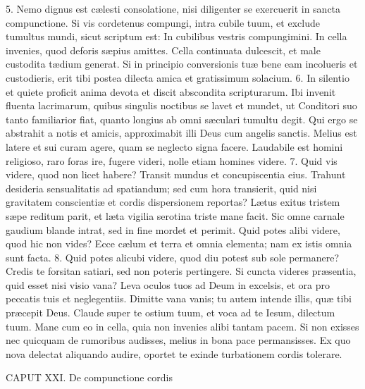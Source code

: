 5. Nemo dignus est cælesti consolatione, nisi diligenter se exercuerit in sancta compunctione. Si vis cordetenus compungi, intra cubile tuum, et exclude tumultus mundi, sicut scriptum est: In cubilibus vestris compungimini. In cella invenies, quod deforis sæpius amittes. Cella continuata dulcescit, et male custodita tædium generat. Si in principio conversionis tuæ bene eam incolueris et custodieris, erit tibi postea dilecta amica et gratissimum solacium.
6. In silentio et quiete proficit anima devota et discit abscondita scripturarum. Ibi invenit fluenta lacrimarum, quibus singulis noctibus se lavet et mundet, ut Conditori suo tanto familiarior fiat, quanto longius ab omni sæculari tumultu degit. Qui ergo se abstrahit a notis et amicis, approximabit illi Deus cum angelis sanctis. Melius est latere et sui curam agere, quam se neglecto signa facere. Laudabile est homini religioso, raro foras ire, fugere videri, nolle etiam homines videre.
7. Quid vis videre, quod non licet habere? Transit mundus et concupiscentia eius. Trahunt desideria sensualitatis ad spatiandum; sed cum hora transierit, quid nisi gravitatem conscientiæ et cordis dispersionem reportas? Lætus exitus tristem sæpe reditum parit, et læta vigilia serotina triste mane facit. Sic omne carnale gaudium blande intrat, sed in fine mordet et perimit. Quid potes alibi videre, quod hic non vides? Ecce cælum et terra et omnia elementa; nam ex istis omnia sunt facta.
8. Quid potes alicubi videre, quod diu potest sub sole permanere? Credis te forsitan satiari, sed non poteris pertingere. Si cuncta videres præsentia, quid esset nisi visio vana? Leva oculos tuos ad Deum in excelsis, et ora pro peccatis tuis et neglegentiis. Dimitte vana vanis; tu autem intende illis, quæ tibi præcepit Deus. Claude super te ostium tuum, et voca ad te Iesum, dilectum tuum. Mane cum eo in cella, quia non invenies alibi tantam pacem. Si non exisses nec quicquam de rumoribus audisses, melius in bona pace permansisses. Ex quo nova delectat aliquando audire, oportet te exinde turbationem cordis tolerare.


CAPUT XXI.
De compunctione cordis

